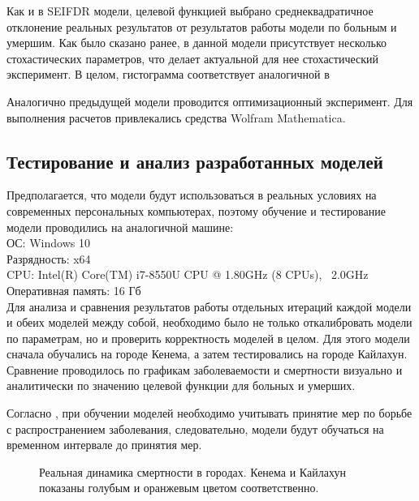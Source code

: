 Как и в SEIFDR модели, целевой функцией выбрано среднеквадратичное отклонение реальных результатов от результатов работы модели по  больным и умершим. Как было сказано ранее, в данной модели присутствует несколько стохастических параметров, что делает актуальной для нее стохастический эксперимент.  В целом, гистограмма соответствует аналогичной в \cite[с. 25]{Bykova:2015}

Аналогично предыдущей модели проводится оптимизационный эксперимент. Для выполнения расчетов привлекались средства Wolfram Mathematica.

\subsection{Тестирование и анализ разработанных моделей}

Предполагается, что модели будут использоваться в реальных условиях на современных персональных компьютерах, поэтому обучение и тестирование модели проводились на аналогичной машине: \\
ОС: Windows 10 \\
Разрядность: x64 \\
CPU: Intel(R) Core(TM) i7-8550U CPU @ 1.80GHz (8 CPUs), ~2.0GHz \\
Оперативная память: 16 Гб \\

Для анализа и сравнения результатов работы отдельных итераций каждой модели и обеих моделей между собой, необходимо было не только откалибровать модели по параметрам, но и проверить корректность моделей в целом. Для этого модели сначала обучались на  городе Кенема, а затем тестировались на городе Кайлахун. Сравнение проводилось по графикам заболеваемости и смертности визуально  и аналитически по значению целевой функции для больных и умерших. 

Согласно %
\cite{Bykova:2015}, при обучении моделей необходимо учитывать принятие мер по борьбе с распространением заболевания, следовательно, модели будут обучаться на временном интервале до принятия мер.


\begin{figure}[H] 
	\caption{Реальная динамика смертности в городах. Кенема и Кайлахун показаны голубым и оранжевым цветом соответственно.}
	\label{RealDeadData}
\end{figure}



